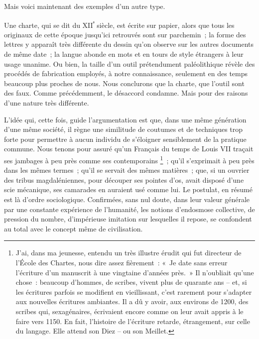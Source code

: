 \documentclass[french,twoside]{book} %
\newcommand{\astermono}{\medskip\centerline{\color{rubric}\large\selectfont{\syms ✻}}\medskip\par}%
\begin{document}
\astermono

\noindent Mais voici maintenant des exemples d’un autre type.\par
Une charte, qui se dit du XII\textsuperscript{ᵉ} siècle, est écrite sur papier, alors que tous les originaux de cette époque jusqu’ici retrouvés sont sur parchemin ; la forme des lettres y apparaît très différente du dessin qu’on observe sur les autres documents de même date ; la langue abonde en mots et en tours de style étrangers à leur usage unanime. Ou bien, la taille d’un outil prétendument paléolithique révèle des procédés de fabrication employés, à notre connaissance, seulement en des temps beaucoup plus  
\label{p54} proches de nous. Nous conclurons que la charte, que l’outil sont des faux. Comme précédemment, le désaccord condamne. Mais pour des raisons d’une nature très différente.\par
L’idée qui, cette fois, guide l’argumentation est que, dans une même génération d’une même société, il règne une similitude de coutumes et de techniques trop forte pour permettre à aucun individu de s’éloigner sensiblement de la pratique commune. Nous tenons pour assuré qu’un Français du temps de Louis VII traçait ses jambages à peu près comme ses contemporains \footnote{J’ai, dans ma jeunesse, entendu un très illustre érudit qui fut directeur de l’École des Chartes, nous dire assez fièrement : « Je date sans erreur l’écriture d’un manuscrit à une vingtaine d’années près. » Il n’oubliait qu’une chose : beau­coup d’hommes, de scribes, vivent plus de quarante ans – et, si les écritures parfois se modifient en vieillissant, c’est rarement pour s’adapter aux nouvelles écritures ambiantes. Il a dû y avoir, aux environs de 1200, des scribes qui, sexa­génaires, écrivaient encore comme on leur avait appris à le faire vers 1150. En fait, l’histoire de l’écriture retarde, étrangement, sur celle du langage. Elle attend son Diez – ou son Meillet.} ; qu’il s’exprimait à peu près dans les mêmes termes ; qu’il se servait des mêmes matières ; que, si un ouvrier des tribus magda­léniennes, pour découper ses pointes d’os, avait disposé d’une scie mécanique, ses camarades en auraient usé comme lui. Le postulat, en résumé ­est là d’ordre sociologique. Confirmées, sans nul doute, dans leur valeur générale par une constante expérience de l’humanité, les notions d’endos­mose collective, de pression du nombre, d’impérieuse imitation sur les­quelles il repose, se confondent au total avec le concept même de civi­lisation.\par
\end{document}
